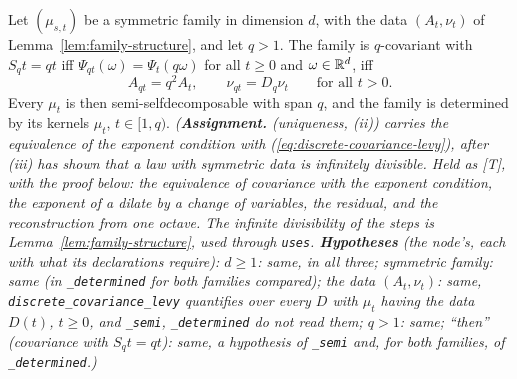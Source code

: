 \begin{lemma}
\label{lem:discrete-covariance-levy}
\leanok
{}
Let $(\mu_{s,t})$ be a symmetric family in dimension $d$, with the data $(A_t, \nu_t)$ of
Lemma~\ref{lem:family-structure}, and let $q > 1$. The family is $q$-covariant with $S_qt = qt$ iff
$\Psi_{qt}(\omega) = \Psi_t(q\omega)$ for all $t \ge 0$ and $\omega \in \mathbb{R}^d$, iff
\begin{equation}
\label{eq:discrete-covariance-levy}
  A_{qt} = q^2A_t, \qquad \nu_{qt} = D_q\nu_t \qquad \text{for all } t > 0.
\end{equation}
Every $\mu_t$ is then semi-selfdecomposable with span $q$, and the family is determined by its
kernels $\mu_t$, $t \in [1, q)$.
\statusA\quad{}\quad\emph{(\textbf{Assignment.}  (uniqueness, (ii)) carries
the equivalence of the exponent condition with (\ref{eq:discrete-covariance-levy}), after
(iii) has shown that a law with symmetric data is infinitely divisible. Held as [T],
with the proof below: the equivalence of covariance with the exponent condition, the exponent of a
dilate by a change of variables, the residual, and the reconstruction from one octave. The infinite
divisibility of the steps is Lemma~\ref{lem:family-structure}, used through \texttt{uses}.
\textbf{Hypotheses} (the node's, each with what its declarations require): $d \ge 1$: same, in all
three; symmetric family: same (in \texttt{\_determined} for both families compared); the data
$(A_t, \nu_t)$: same, \texttt{discrete\_covariance\_levy} quantifies over every $D$ with $\mu_t$
having the data $D(t)$, $t \ge 0$, and \texttt{\_semi}, \texttt{\_determined} do not read them;
$q > 1$: same; ``then'' (covariance with $S_qt = qt$): same, a hypothesis of \texttt{\_semi} and,
for both families, of \texttt{\_determined}.)}
\end{lemma}

